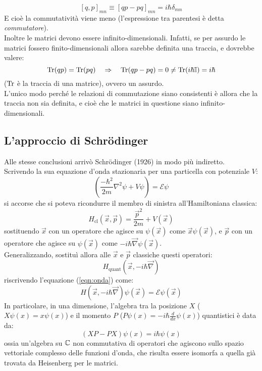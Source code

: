 \documentclass[FisicaTeorica.tex]{subfiles}
\begin{document}
\[
[q,p]_{mn} \equiv [qp - pq]_{mn} = i\hbar \delta_{mn}
\]
E cioè la commutatività viene meno (l'espressione tra parentesi è detta \textit{commutatore}).\\
Inoltre le matrici devono essere infinito-dimensionali. Infatti, se per assurdo le matrici fossero finito-dimensionali allora sarebbe definita una traccia, e dovrebbe valere:
\[
\operatorname{Tr}(qp) = \operatorname{Tr}(pq) \quad \Rightarrow \quad \operatorname{Tr}(qp-pq) = 0 \neq \operatorname{Tr}(i\hbar \mathbb{I}) = i \hbar
\]
($\operatorname{Tr}$ è la traccia di una matrice), ovvero un assurdo.\\
L'unico modo perché le relazioni di commutazione siano consistenti è allora che la traccia non sia definita, e cioè che le matrici in questione siano infinito-dimensionali.\\

\subsection{L'approccio di Schrödinger}
Alle stesse conclusioni arrivò Schrödinger (1926) in modo più indiretto.\\
Scrivendo la sua equazione d'onda stazionaria per una particella con potenziale $V$:
\begin{equation}
    \left(\frac{{-\hbar}^2}{2m}\nabla^2\psi+V\psi\right)=\mathcal{E}\psi
    \label{eqn:onda}
\end{equation}
si accorse che si poteva ricondurre il membro di sinistra all'Hamiltoniana classica: 
\[H_\mathrm{cl}\left(\vec{x},\vec{p}\right)=\frac{{\vec{p}}^2}{2m}+V(\vec{x})\]
sostituendo $\vec{x}$ con un operatore che agisce su $\psi(\vec{x})$ come $\vec{x}\psi(\vec{x})$, e $\vec{p}$ con un operatore che agisce su $\psi(\vec{x})$ come $-i\hbar \vec{\nabla}\psi(\vec{x})$.\\
Generalizzando, sostituì allora alle $\vec{x}$ e $\vec{p}$ classiche questi operatori:
\[
H_{\mathrm{quant}}(\vec{x}, -i\hbar \vec{\nabla})
\]
riscrivendo l'equazione (\ref{eqn:onda}) come:
\begin{equation}
H\left(\vec{x},-i\hbar\vec{\nabla}\right)\psi\left(\vec{x}\right)=\mathcal{E}\psi\left(\vec{x}\right)
\label{eqn:onda_op}
\end{equation}
In particolare, in una dimensione, l'algebra tra la posizione $X$ ($X\psi(x) = x\psi(x)$) e il momento $P$ ($P\psi(x) = -i\hbar \frac{d}{dx}\psi(x)$) quantistici è data da:
\[
(XP-PX)\psi(x)=i\hbar\psi(x)
\]
ossia un'algebra su $\mathbb{C}$ non commutativa di operatori che agiscono sullo spazio vettoriale complesso delle funzioni d'onda, che risulta essere isomorfa a quella già trovata da Heisenberg per le matrici.\\
\end{document}
